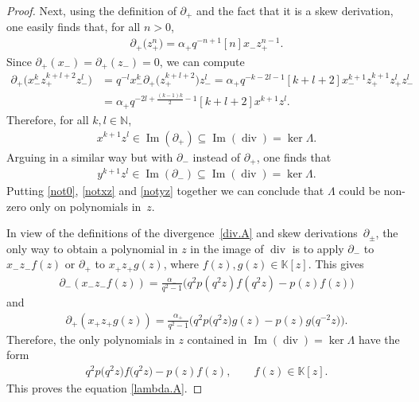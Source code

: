 \documentclass[10pt,a4paper]{amsart}
\numberwithin{equation}{section}
\begin{document}
\begin{proof}
Next, using the def\/inition of $\partial_+$ and the fact that it is a skew derivation, one easily f\/inds that, for all $n>0$,
\begin{gather*}
\partial_+\big(z_+^n\big) = \alpha_+ q^{-n+1} [n] x_-z_+^{n-1}.
\end{gather*}
Since $\partial_+(x_-) = \partial_+(z_-) = 0$, we can compute
\begin{align*}
\partial_+\big(x_-^kz_{+}^{k+l+2}z_-^l\big) &= q^{-l} x_-^k\partial_+\big(z_{+}^{k+l+2}\big)z_-^l = \alpha_+
q^{-k-2l-1}[k+l+2] x_-^{k+1}z_+^{k+1} z_+^lz_-^l\\
&= \alpha_+ q^{-2l +\frac{(k-1)k}2 - 1}[k+l+2] x^{k+1} z^l.
\end{align*}
Therefore, for all $k,l\in {\mathbb N}$,
\begin{gather}\label{notxz}
x^{k+1} z^l \in \operatorname{Im} (\partial_+ )\subseteq \operatorname{Im} (\operatorname{div} ) = \ker \Lambda.
\end{gather}
Arguing in a similar way but with $\partial_-$ instead of $\partial_+$, one f\/inds that
\begin{gather}\label{notyz}
y^{k+1} z^l \in \operatorname{Im}\left(\partial_-\right)\subseteq \operatorname{Im}\left(\operatorname{div}\right) = \ker \Lambda.
\end{gather}
Putting \eqref{not0}, \eqref{notxz} and \eqref{notyz} together we can conclude that $\Lambda$ could be non-zero only on polynomials in~$z$.

In view of the def\/initions of the divergence~\eqref{div.A} and skew derivations~$\partial_\pm$, the only way to obtain a polynomial in $z$ in the image of $\operatorname{div}$ is to apply $\partial_-$ to $x_-z_- f(z)$ or $\partial_+$ to $x_+z_+ g(z)$, where $f(z),g(z)\in {\mathbb K}[z]$. This gives
\begin{gather*}
\partial_-(x_-z_- f(z)) = \frac{\alpha_-}{q^2 -1}\big(q^2 p(q^2 z)f(q^2 z) - p(z)f(z)\big)
\end{gather*}
and
\begin{gather*}
\partial_+(x_+z_+ g(z)) = \frac{\alpha_+}{q^2 -1}\big(q^2 p\big(q^2 z\big)g(z) - p(z)g\big(q^{-2}z\big)\big).
\end{gather*}
Therefore, the only polynomials in $z$ contained in $\operatorname{Im}(\operatorname{div}) = \ker \Lambda$ have the form
\begin{gather*}%
q^2 p\big(q^2 z\big)f\big(q^2 z\big) - p(z)f(z), \qquad f(z)\in {\mathbb K}[z].
\end{gather*}
This proves the equation \eqref{lambda.A}.


\end{proof}
\end{document}
